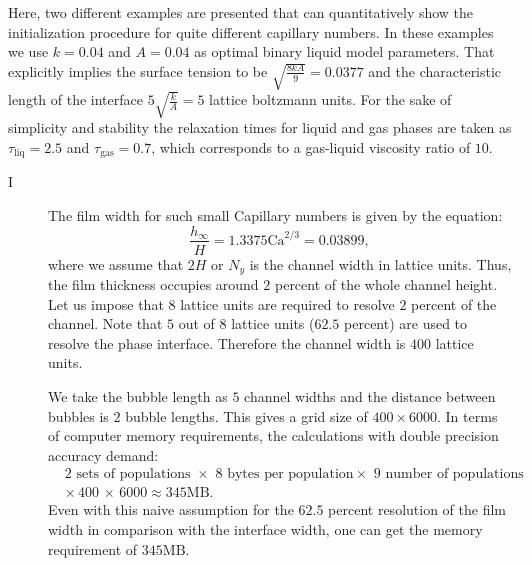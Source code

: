 \documentclass{article}
\newcommand{\Ca}{\mathrm{Ca}}
\begin{document}
Here, two different examples are presented that can quantitatively show the
initialization procedure for quite different capillary numbers. In these
examples we use $k=0.04$ and $A=0.04$ as optimal binary liquid model parameters.
That explicitly implies the surface tension to be $\sqrt{\frac{8 k
A}{9}}=0.0377$ and the characteristic length of the interface
$5\sqrt{\frac{k}{A}}=5$ lattice boltzmann units. For the sake of simplicity and
stability the relaxation times for liquid and gas phases are taken as
$\tau_{\mathrm{liq}}=2.5$ and $\tau_{\mathrm{gas}}=0.7$, which corresponds
to a gas-liquid viscosity ratio of $10$.
\begin{description}
 \item[I ]
  The film width for such small Capillary numbers \cite{bretherton} is
given by the equation:
  \begin{equation}
  \frac{h_{\infty}}{H}=1.3375 \Ca^{2/3}=0.03899,
  \end{equation}
  where we assume that $2 H$ or $N_y$ is the channel width in lattice units. Thus, the film
thickness occupies around $2$ percent of the whole channel height. Let us impose that $8$ lattice
units are required to resolve  $2$ percent of the channel. Note that $5$ out of $8$ lattice units
($62.5$ percent) are used to resolve the phase interface. Therefore the channel width is $400$
lattice units.

We take the bubble length as $5$ channel widths
  and the distance between bubbles is $2$ bubble lengths. This gives a
grid size of $400 \times 6000$. In terms of computer memory
requirements, the calculations with double precision accuracy demand:
\begin{equation}
\begin{aligned}
&2\text{ sets of populations } \times \,\, 8\,\, \text{bytes per population
} \times \,\, 9 \text{ number of
populations}\\
&\times\,400\,\times\,6000\approx 345 \mathrm{MB}. 
\end{aligned}
\end{equation}
Even with this naive assumption for the $62.5$ percent resolution of the film
width in comparison with the interface width, one can get the memory
requirement of $345 \mathrm{MB}$. 


\end{description}
\end{document}
